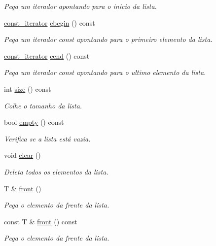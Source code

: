 \begin{DoxyCompactItemize}
\begin{DoxyCompactList}\small\item\em Pega um iterador apontando para o inicio da lista. \end{DoxyCompactList}\item 
\hyperlink{class_list_1_1const__iterator}{const\+\_\+iterator} \hyperlink{class_list_a8affd35c61fccd7b4c7968d6c481fd27}{cbegin} () const 
\begin{DoxyCompactList}\small\item\em Pega um iterador const apontando para o primeiro elemento da lista. \end{DoxyCompactList}\item 
\hyperlink{class_list_1_1const__iterator}{const\+\_\+iterator} \hyperlink{class_list_af21c0053d502872bb1d14ab896e37f2e}{cend} () const 
\begin{DoxyCompactList}\small\item\em Pega um iterador const apontando para o ultimo elemento da lista. \end{DoxyCompactList}\item 
int \hyperlink{class_list_a802e2aa9aaef248591140fa032d20d61}{size} () const 
\begin{DoxyCompactList}\small\item\em Colhe o tamanho da lista. \end{DoxyCompactList}\item 
bool \hyperlink{class_list_ad96bf379b8e75539b20ad30d10f10269}{empty} () const 
\begin{DoxyCompactList}\small\item\em Verifica se a lista está vazia. \end{DoxyCompactList}\item 
void \hyperlink{class_list_ae296516a252e11963dbf963727ce429a}{clear} ()
\begin{DoxyCompactList}\small\item\em Deleta todos os elementos da lista. \end{DoxyCompactList}\item 
T \& \hyperlink{class_list_ad07fb4dd1af3e2b5335476d931417631}{front} ()
\begin{DoxyCompactList}\small\item\em Pega o elemento da frente da lista. \end{DoxyCompactList}\item 
const T \& \hyperlink{class_list_aa485ade02602d7594a76e78d2b1815bb}{front} () const 
\begin{DoxyCompactList}\small\item\em Pega o elemento da frente da lista. \end{DoxyCompactList}\item 

\end{DoxyCompactItemize}
